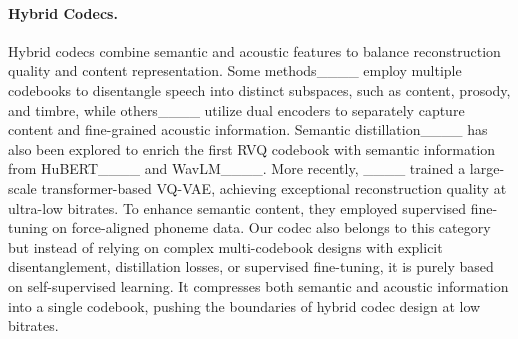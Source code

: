 \paragraph{Hybrid Codecs.}
Hybrid codecs combine semantic and acoustic features to balance reconstruction quality and content representation. Some methods____ employ multiple codebooks to disentangle speech into distinct subspaces, such as content, prosody, and timbre, while others____ utilize dual encoders to separately capture content and fine-grained acoustic information. Semantic distillation____ has also been explored to enrich the first RVQ codebook with semantic information from HuBERT____ and WavLM____. More recently, ____ trained a large-scale transformer-based VQ-VAE, achieving exceptional reconstruction quality at ultra-low bitrates. To enhance semantic content, they employed supervised fine-tuning on force-aligned phoneme data.
Our codec also belongs to this category but instead of relying on complex multi-codebook designs with explicit disentanglement, distillation losses, or supervised fine-tuning, it is purely based on self-supervised learning. It compresses both semantic and acoustic information into a single codebook, pushing the boundaries of hybrid codec design at low bitrates.